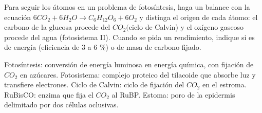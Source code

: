 \documentclass{book}
\begin{document}

\begin{tcolorbox}[title={Consejo}, studiumtip, breakable]

Para seguir los átomos en un problema de fotosíntesis, haga un balance con la ecuación \(6 CO_{2} + 6 H_{2}O \to C_{6}H_{12}O_{6} + 6 O_{2}\) y distinga el origen de cada átomo: el carbono de la glucosa procede del \(CO_{2} (\)ciclo de Calvin) y el oxígeno gaseoso procede del agua (fotosistema II). Cuando se pida un rendimiento, indique si es de energía (eficiencia de 3 a 6 \%) o de masa de carbono fijado.

\end{tcolorbox}

\begin{tcolorbox}[title={Definición}, studiumdef, breakable]

Fotosíntesis: conversión de energía luminosa en energía química, con fijación de \(CO_{2}\) en azúcares. Fotosistema: complejo proteico del tilacoide que absorbe luz y transfiere electrones. Ciclo de Calvin: ciclo de fijación del \(CO_{2}\) en el estroma. RuBisCO: enzima que fija el \(CO_{2}\) al RuBP. Estoma: poro de la epidermis delimitado por dos células oclusivas.

\end{tcolorbox}
\end{document}
